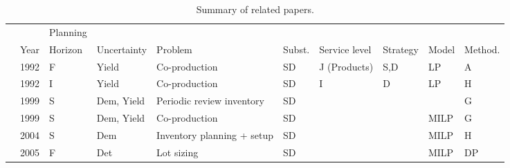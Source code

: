 \begin{table}[ht]
\caption{Summary of related papers.}
\begin{adjustbox}{width=1\textwidth,center=\textwidth}
\begin{tabular}{llllllllll}
\toprule
 & & Planning \\
                          & Year                                    & Horizon                        & Uncertainty                       & Problem                         & Subst.        & Service level                & Strategy       & Model               &      Method.        \\
                          \midrule

\citeauthor{bitran1992deterministic}         & 1992                                    & F                                       & Yield                             & Co-production                   & SD                  & J (Products)                 & S,D            & LP                          &     A         \\
\citeauthor{bitran1992ordering}           & 1992                                    & I                                       & Yield                             & Co-production                   & SD                  & I                            & D              & LP                      &  H            \\
\citeauthor{bassok1999single}             & 1999                                    & S                                       & Dem, Yield                     & Periodic review inventory & SD                  &                              &                &                           &       G       \\
\citeauthor{hsu1999random}            & 1999                                    & S                                       & Dem, Yield                     & Co-production                   & SD                  &                              &                & MILP                   &    G           \\
\citeauthor{rao2004multi}                & 2004                                    &   S                                      & Dem                               & Inventory planning + setup      & SD                  &                              &                &                 MILP         &  H            \\
\citeauthor{hsu2005dynamic}                & 2005                                    & F                                       & Det                               & Lot sizing                      & SD                  &                              &                &                  MILP         & DP             \\

\end{tabular}
\end{adjustbox}
\end{table}
